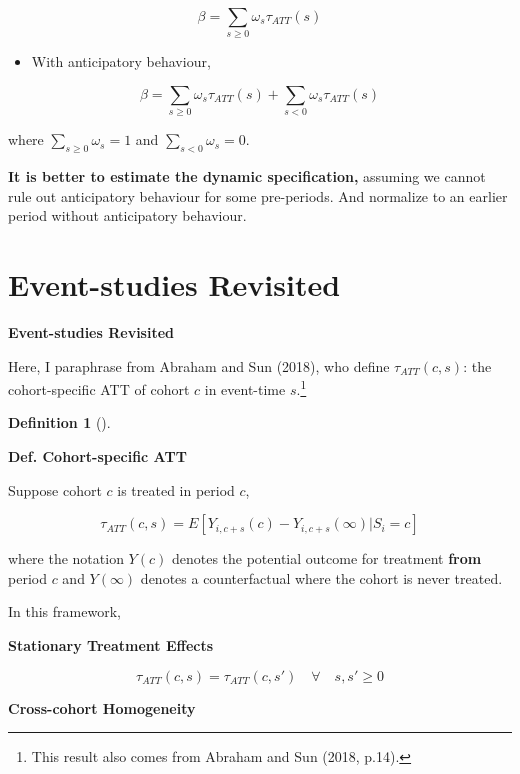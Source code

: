 \documentclass[
  letterpaper,
  DIV=11,
  numbers=noendperiod]{scrreprt}
\providecommand{\tightlist}{%
  \setlength{\itemsep}{0pt}\setlength{\parskip}{0pt}}\usepackage{longtable,booktabs,array}
\theoremstyle{definition}
\newtheorem{definition}{Definition}[chapter]
\theoremstyle{remark}
\begin{document}
\[
\beta = \sum_{s\geq 0}\omega_s \tau_{ATT}(s)
\]

\begin{itemize}
\tightlist
\item
  With anticipatory behaviour,
\end{itemize}

\[
\beta = \sum_{s\geq 0}\omega_s \tau_{ATT}(s) + \sum_{s< 0}\omega_s \tau_{ATT}(s)
\]

where \(\sum_{s\geq 0}\omega_s = 1\) and \(\sum_{s< 0}\omega_s = 0\).

\textbf{It is better to estimate the dynamic specification,} assuming we
cannot rule out anticipatory behaviour for some pre-periods. And
normalize to an earlier period without anticipatory behaviour.

\hypertarget{event-studies-revisited}{%
\section{Event-studies Revisited}\label{event-studies-revisited}}

\textbf{Event-studies Revisited}

Here, I paraphrase from Abraham and Sun (2018), who define
\(\tau_{ATT}(c,s)\): the cohort-specific ATT of cohort \(c\) in
event-time \(s\).\footnote{This result also comes from Abraham and Sun
  (2018, p.14).}

\begin{definition}[]\protect\hypertarget{def-cohort-specific-att}{}\label{def-cohort-specific-att}

\textbf{Def. Cohort-specific ATT}

Suppose cohort \(c\) is treated in period \(c\),

\[
\tau_{ATT}(c,s) = E[Y_{i,c+s}(c)-Y_{i,c+s}(\infty)|S_i=c]
\]

where the notation \(Y(c)\) denotes the potential outcome for treatment
\textbf{from} period \(c\) and \(Y(\infty)\) denotes a counterfactual
where the cohort is never treated.

\end{definition}

In this framework,

\leavevmode{}%
\textbf{Stationary Treatment Effects}

\[
\tau_{ATT}(c,s) = \tau_{ATT}(c,s')\quad \forall\quad s,s'\geq0
\]

\leavevmode{}%
\textbf{Cross-cohort Homogeneity}
\end{document}
